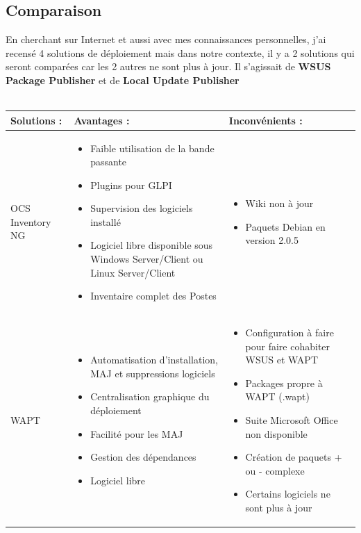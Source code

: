 \documentclass[11pt,a4paper,oneside]{article}
\begin{document}
\subsection{Comparaison}
En cherchant sur Internet et aussi avec mes connaissances personnelles, j'ai recensé 4 solutions de déploiement mais dans notre contexte, il y a 2 solutions qui seront comparées car les 2 autres ne sont plus à jour. Il s'agissait de \textbf{WSUS Package Publisher} et de \textbf{Local Update Publisher} \\ \\
\begin{tabular}{|p{3.1cm}|p{6.5cm}|p{6.5cm}|}
	\hline
	\centering Solutions : & \centering Avantages : & Inconvénients : \\
	\hline
	\centering OCS Inventory NG  & \begin{itemize}
							\item Faible utilisation de la bande passante 
							\item Plugins pour GLPI							
							\item Supervision des logiciels installé
							\item Logiciel libre disponible sous Windows Server/Client ou Linux Server/Client
							\item Inventaire complet des Postes							
									\end{itemize} & \begin{itemize}
												\item Wiki non à jour  
												\item Paquets Debian en version 2.0.5
										\end{itemize} \\
	\hline
	\centering WAPT  & \begin{itemize}
							\item Automatisation d'installation, MAJ et suppressions logiciels 
							\item Centralisation graphique du déploiement
							\item Facilité pour les MAJ 
							\item Gestion des dépendances
							\item Logiciel libre													
						\end{itemize} & \begin{itemize}
												\item Configuration à faire pour faire cohabiter WSUS et WAPT 
												\item Packages propre à WAPT (.wapt)
												\item Suite Microsoft Office non disponible
												\item Création de paquets + ou - complexe
												\item Certains logiciels ne sont plus à jour			
										\end{itemize} \\
	\hline	
\end{tabular}
\end{document}
